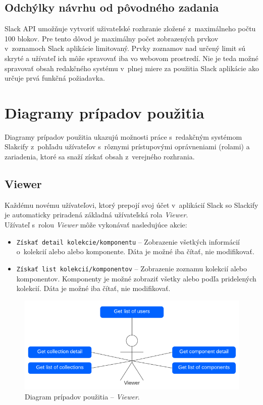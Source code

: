 \subsection{Odchýlky návrhu od pôvodného zadania}
Slack API umožňuje vytvoriť uživateľské rozhranie zložené z~maximálneho počtu 100 blokov. Pre tento dôvod je maximálny počet zobrazených prvkov v~zoznamoch Slack aplikácie limitovaný. Prvky zoznamov nad určený limit sú skryté a užívateľ ich môže spravovať iba vo webovom prostredí. Nie je teda možné spravovať obsah redakčného systému v~plnej miere za použitia Slack aplikácie ako určuje prvá funkčná požiadavka.

\section{Diagramy prípadov použitia}
\label{design:use_case}
Diagramy prípadov použitia ukazujú možnosti práce s~redakčným systémom Slakcify z~pohľadu užívateľov s~rôznymi prístupovými oprávneniami (rolami) a zariadenia, ktoré sa snaží získať obsah z~verejného rozhrania.

\subsection{Viewer}
Každému novému užívateľovi, ktorý prepojí svoj účet v~aplikácií Slack so Slackify je automaticky priradená základná užívateľská rola \emph{Viewer}. \\

\noindent Užívateľ s~rolou \emph{Viewer} môže vykonávať nasledujúce akcie:

\begin{itemize}
	\item \texttt{Získať detail kolekcie/komponentu} -- Zobrazenie všetkých informácií o~kolekcií alebo alebo komponente. Dáta je možné iba čítať, nie modifikovať.
	\item \texttt{Získať list kolekcií/komponentov} -- Zobrazenie zoznamu kolekcií alebo komponentov. Komponenty je možné zobraziť všetky alebo podľa pridelených kolekcií. Dáta je možné iba čítať, nie modifikovať.
\end{itemize}

\begin{figure}[h]
	\centering
	\includegraphics[scale=0.9]{obrazky-figures/viewer_use_case}
	\caption{Diagram prípadov použitia -- \emph{Viewer}.}
\end{figure}

